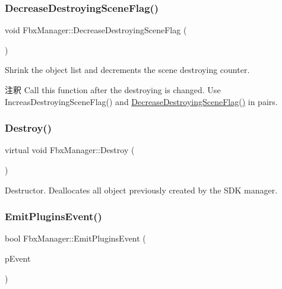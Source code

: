 \mbox{\label{class_fbx_manager_a8967a8b28f427bee9e0737ae8d81cbe2}} 
\subsubsection{\texorpdfstring{Decrease\+Destroying\+Scene\+Flag()}{DecreaseDestroyingSceneFlag()}}
{\footnotesize\ttfamily void Fbx\+Manager\+::\+Decrease\+Destroying\+Scene\+Flag (\begin{DoxyParamCaption}{ }\end{DoxyParamCaption})}

Shrink the object list and decrements the scene destroying counter. \begin{DoxyRemark}{注釈}
Call this function after the destroying is changed. Use Increas\+Destroying\+Scene\+Flag() and \hyperlink{class_fbx_manager_a8967a8b28f427bee9e0737ae8d81cbe2}{Decrease\+Destroying\+Scene\+Flag()} in pairs. 
\end{DoxyRemark}
\mbox{\label{class_fbx_manager_aea778b97b3f0d13578ed0653a9e1212c}} 
\subsubsection{\texorpdfstring{Destroy()}{Destroy()}}
{\footnotesize\ttfamily virtual void Fbx\+Manager\+::\+Destroy (\begin{DoxyParamCaption}{ }\end{DoxyParamCaption})\hspace{0.3cm}{\ttfamily [virtual]}}

Destructor. Deallocates all object previously created by the S\+DK manager. \mbox{\label{class_fbx_manager_a82145985af0000ad13ff22e4e28e29a3}} 
\subsubsection{\texorpdfstring{Emit\+Plugins\+Event()}{EmitPluginsEvent()}}
{\footnotesize\ttfamily bool Fbx\+Manager\+::\+Emit\+Plugins\+Event (\begin{DoxyParamCaption}\item[{const \hyperlink{class_fbx_event_base}{Fbx\+Event\+Base} \&}]{p\+Event }\end{DoxyParamCaption})}

